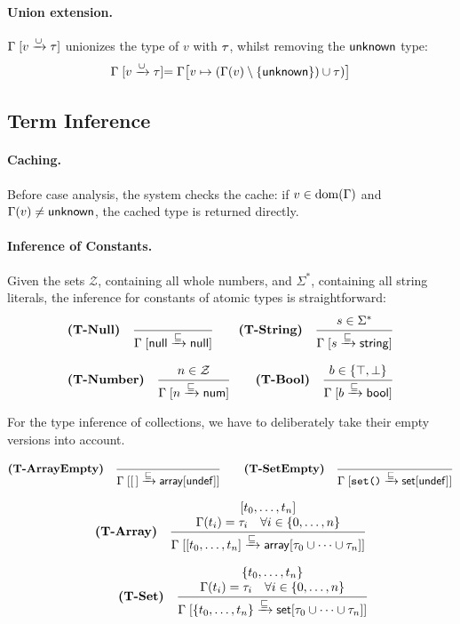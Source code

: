 \paragraph{Union extension.}
$\Gamma \mathrel{[v \xrightarrow{\cup} \tau]}$ unionizes the type of $v$ with $\tau$, whilst removing the $\mathsf{unknown}$ type:
\[
  \Gamma \mathrel{[v \xrightarrow{\cup} \tau]} = \Gamma\bigl[v \mapsto (\Gamma(v) \setminus \{\mathsf{unknown}\}) \cup \tau)\bigr]
\]

\subsection{Term Inference}
\label{sec:term-inference}

\paragraph{Caching.}
Before case analysis, the system checks the cache:
if $v \in \mathrm{dom}(\Gamma)$ and $\Gamma(v) \neq \mathsf{unknown}$, the cached type is returned directly.


\paragraph{Inference of Constants.}
Given the sets $\mathcal{Z}$, containing all whole numbers, and $\Sigma^*$, containing all string literals, the inference for constants of atomic types is straightforward:
\[
\textbf{(T-Null)}\quad
\inferrule{ }{\refine{\Null}{\Null}}
\qquad
\textbf{(T-String)}\quad
\inferrule{ s \in \Sigma^* }{\refine{s}{\Str}}
\]

\[
\textbf{(T-Number)}\quad
\inferrule{ n \in \mathcal{Z} }{\refine{n}{\Int}}
\qquad
\textbf{(T-Bool)}\quad
\inferrule{ b \in \{\top,\bot\} }{\refine{b}{\Bool}}
\]

For the type inference of collections, we have to deliberately take their empty versions into account.

\[
\textbf{(T-ArrayEmpty)}\quad
\inferrule{ }{\refine{[\,]}{\Array{\Undef}}}
\qquad
\textbf{(T-SetEmpty)}\quad
\inferrule{ }{\refine{\texttt{set()}}{\RegoSet{\Undef}}}
\]

\[
\textbf{(T-Array)}\quad
\inferrule{
  [t_0, \ldots, t_n] \\
  \typof(t_i) = \ty_i \quad \forall \ranges{i}{0}{n}
}{
  \refine{[t_0, \ldots, t_n]}{\Array{\ty_0 \cup \cdots \cup \ty_n}}
}
\]

\[
\qquad
\textbf{(T-Set)}\quad
\inferrule{
  \{t_0, \ldots, t_n\} \\
  \typof(t_i) = \ty_i \quad \forall \ranges{i}{0}{n}
}{
  \refine{\{t_0, \ldots, t_n\}}{\RegoSet{\ty_0 \cup \cdots \cup \ty_n}}
}
\]

